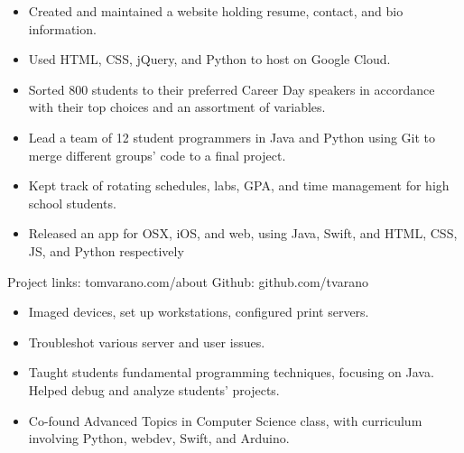 \documentclass[11pt]{article}
\begin{document}
\vspace{2mm}
{\fontsize{10}{12}\robotocondlight
\begin{itemize}[noitemsep,nolistsep]
    \item Created and maintained a website holding resume, contact, and bio information.
    \item Used {\robotocond HTML}, {\robotocond CSS}, {\robotocond jQuery}, and {\robotocond Python} to host on {\robotocond Google Cloud}.
\end{itemize}
\begin{itemize}[noitemsep,nolistsep]
    \item Sorted 800 students to their preferred Career Day speakers in accordance with their top choices and an assortment of variables.
    \item Lead a team of 12 student programmers in {\robotocond Java} and {\robotocond Python} using {\robotocond Git} to merge different groups’ code to a final project.
\end{itemize}
\begin{itemize}[noitemsep,nolistsep]
    \item Kept track of rotating schedules, labs, GPA, and time management for high school students. 
    \item Released an app for OSX, iOS, and web, using {\robotocond Java}, {\robotocond Swift},
     and {\robotocond HTML}, {\robotocond CSS}, {\robotocond JS}, and {\robotocond Python} respectively
\end{itemize}
{\fontsize{8}{10}\robotocondlight Project links: tomvarano.com/about \hfill Github: github.com/tvarano
}
\vspace{-5mm}
\hsep
\vspace{-3mm}

\vspace{2mm}
{\fontsize{10}{12}\robotocondlight
    \begin{itemize}[noitemsep,nolistsep]
        \item Imaged devices, set up workstations, configured print servers. 
        \item Troubleshot various server and user issues.
    \end{itemize}
    \vspace{3mm}
    \begin{itemize}[noitemsep,nolistsep]
        \item Taught students fundamental programming techniques, focusing on Java. Helped debug and analyze students’ projects. 
        \item Co-found Advanced Topics in Computer Science class, with curriculum involving Python, webdev, Swift, and Arduino. 
    \end{itemize}
    \vspace{3mm}

}}
\end{document}

